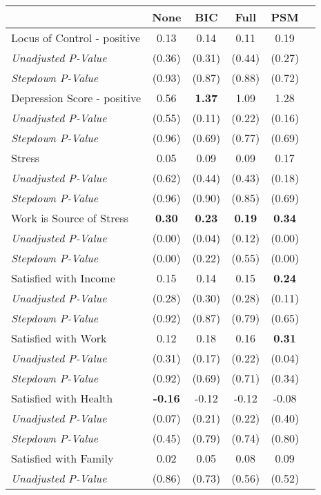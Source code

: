 \begin{tabular}{l c c c c c}
\toprule
 & None & BIC & Full & PSM \\
\midrule
Locus of Control - positive & 0.13 & 0.14 & 0.11 & 0.19 \\
\quad \textit{Unadjusted P-Value} & (0.36) & (0.31) & (0.44) & (0.27) \\
\quad \textit{Stepdown P-Value} & (0.93) & (0.87) & (0.88) & (0.72) \\
Depression Score - positive & 0.56 & \textbf{ 1.37 } & 1.09 & 1.28 \\
\quad \textit{Unadjusted P-Value} & (0.55) & (0.11) & (0.22) & (0.16) \\
\quad \textit{Stepdown P-Value} & (0.96) & (0.69) & (0.77) & (0.69) \\
Stress & 0.05 & 0.09 & 0.09 & 0.17 \\
\quad \textit{Unadjusted P-Value} & (0.62) & (0.44) & (0.43) & (0.18) \\
\quad \textit{Stepdown P-Value} & (0.96) & (0.90) & (0.85) & (0.69) \\
Work is Source of Stress & \textbf{ 0.30 } & \textbf{ 0.23 } & \textbf{ 0.19 } & \textbf{ 0.34 } \\
\quad \textit{Unadjusted P-Value} & (0.00) & (0.04) & (0.12) & (0.00) \\
\quad \textit{Stepdown P-Value} & (0.00) & (0.22) & (0.55) & (0.00) \\
Satisfied with Income & 0.15 & 0.14 & 0.15 & \textbf{ 0.24 } \\
\quad \textit{Unadjusted P-Value} & (0.28) & (0.30) & (0.28) & (0.11) \\
\quad \textit{Stepdown P-Value} & (0.92) & (0.87) & (0.79) & (0.65) \\
Satisfied with Work & 0.12 & 0.18 & 0.16 & \textbf{ 0.31 } \\
\quad \textit{Unadjusted P-Value} & (0.31) & (0.17) & (0.22) & (0.04) \\
\quad \textit{Stepdown P-Value} & (0.92) & (0.69) & (0.71) & (0.34) \\
Satisfied with Health & \textbf{ -0.16 } & -0.12 & -0.12 & -0.08 \\
\quad \textit{Unadjusted P-Value} & (0.07) & (0.21) & (0.22) & (0.40) \\
\quad \textit{Stepdown P-Value} & (0.45) & (0.79) & (0.74) & (0.80) \\
Satisfied with Family & 0.02 & 0.05 & 0.08 & 0.09 \\
\quad \textit{Unadjusted P-Value} & (0.86) & (0.73) & (0.56) & (0.52) \\

\end{tabular}
